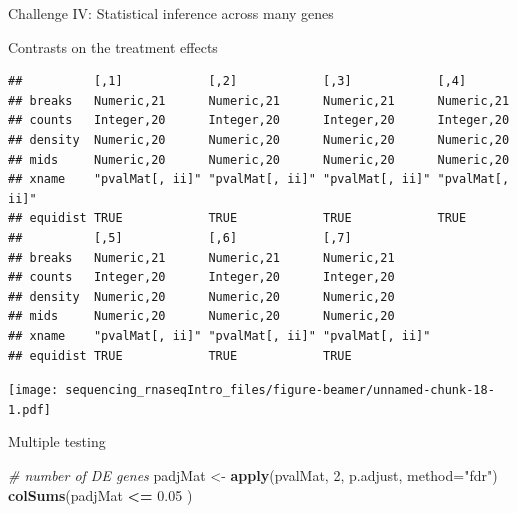\documentclass[ignorenonframetext,]{beamer}
\newenvironment{Shaded}{\begin{snugshade}}{\end{snugshade}}
\newcommand{\CommentTok}[1]{\textcolor[rgb]{0.56,0.35,0.01}{\textit{#1}}}
\newcommand{\ControlFlowTok}[1]{\textcolor[rgb]{0.13,0.29,0.53}{\textbf{#1}}}
\newcommand{\DataTypeTok}[1]{\textcolor[rgb]{0.13,0.29,0.53}{#1}}
\newcommand{\DecValTok}[1]{\textcolor[rgb]{0.00,0.00,0.81}{#1}}
\newcommand{\FloatTok}[1]{\textcolor[rgb]{0.00,0.00,0.81}{#1}}
\newcommand{\KeywordTok}[1]{\textcolor[rgb]{0.13,0.29,0.53}{\textbf{#1}}}
\newcommand{\NormalTok}[1]{#1}
\newcommand{\OperatorTok}[1]{\textcolor[rgb]{0.81,0.36,0.00}{\textbf{#1}}}
\newcommand{\StringTok}[1]{\textcolor[rgb]{0.31,0.60,0.02}{#1}}
\begin{document}
\begin{frame}[fragile]{Challenge IV: Statistical inference across many
genes}
\begin{block}{Contrasts on the treatment effects}
\begin{Shaded}
\end{Shaded}

\begin{verbatim}
##          [,1]            [,2]            [,3]            [,4]           
## breaks   Numeric,21      Numeric,21      Numeric,21      Numeric,21     
## counts   Integer,20      Integer,20      Integer,20      Integer,20     
## density  Numeric,20      Numeric,20      Numeric,20      Numeric,20     
## mids     Numeric,20      Numeric,20      Numeric,20      Numeric,20     
## xname    "pvalMat[, ii]" "pvalMat[, ii]" "pvalMat[, ii]" "pvalMat[, ii]"
## equidist TRUE            TRUE            TRUE            TRUE           
##          [,5]            [,6]            [,7]           
## breaks   Numeric,21      Numeric,21      Numeric,21     
## counts   Integer,20      Integer,20      Integer,20     
## density  Numeric,20      Numeric,20      Numeric,20     
## mids     Numeric,20      Numeric,20      Numeric,20     
## xname    "pvalMat[, ii]" "pvalMat[, ii]" "pvalMat[, ii]"
## equidist TRUE            TRUE            TRUE
\end{verbatim}

\texttt{[image: sequencing\_rnaseqIntro\_files/figure-beamer/unnamed-chunk-18-1.pdf]}

\begin{block}{Multiple testing}

\begin{Shaded}
\begin{Highlighting}[]
\CommentTok{# number of DE genes}
\NormalTok{padjMat <-}\StringTok{ }\KeywordTok{apply}\NormalTok{(pvalMat, }\DecValTok{2}\NormalTok{, p.adjust, }\DataTypeTok{method=}\StringTok{"fdr"}\NormalTok{)}
\KeywordTok{colSums}\NormalTok{(padjMat }\OperatorTok{<=}\StringTok{ }\FloatTok{0.05}\NormalTok{ )}
\end{Highlighting}
\end{Shaded}


\end{block}
\end{block}
\end{frame}
\end{document}
